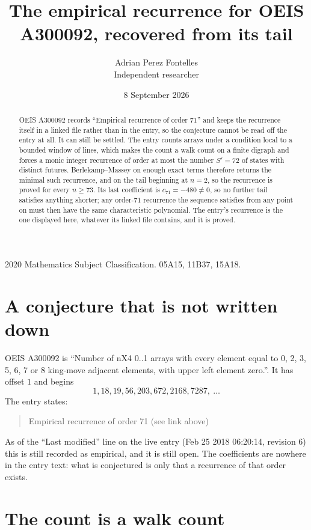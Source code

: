 \documentclass[11pt,a4paper]{article}
\title{The empirical recurrence for OEIS A300092, recovered from its tail}
\author{Adrian Perez Fontelles\\ \small Independent researcher}
\date{8 September 2026}
\theoremstyle{plain}
\theoremstyle{definition}
\begin{document}
\maketitle

\begin{abstract}
OEIS A300092 records ``Empirical recurrence of order $71$'' and keeps the recurrence itself in
a linked file rather than in the entry, so the conjecture cannot be read off the entry at all.
It can still be settled. The entry counts arrays under a condition local to a bounded window of
lines, which makes the count a walk count on a finite digraph and forces a monic integer
recurrence of order at most the number $S'=72$ of states with distinct futures. Berlekamp--Massey on
enough exact terms therefore returns the minimal such recurrence, and on the tail beginning at $n=2$, so the recurrence is proved for every $n\ge73$.
Its last coefficient is $c_{71}=-480\neq0$, so no further tail satisfies anything
shorter; any order-$71$ recurrence the sequence satisfies from any point on must then have
the same characteristic polynomial. The entry's recurrence is the one displayed here, whatever
its linked file contains, and it is proved.
\end{abstract}

\noindent\small 2020 Mathematics Subject Classification. 05A15, 11B37, 15A18.\normalsize

\section{A conjecture that is not written down}

OEIS A300092 is ``Number of nX4 0..1 arrays with every element equal to 0, 2, 3, 5, 6, 7 or 8 king-move adjacent elements, with upper left element zero.''. It has offset $1$ and begins
\[
1, 18, 19, 56, 203, 672, 2168, 7287,\ \dots
\]
The entry states:
\begin{quote}
Empirical recurrence of order 71 (see link above)
\end{quote}
As of the ``Last modified'' line on the live entry (Feb 25 2018 06:20:14, revision 6)
this is still recorded as empirical, and it is still open. The coefficients are nowhere in the
entry text: what is conjectured is only that a recurrence of that order exists.

\section{The count is a walk count}
\end{document}
